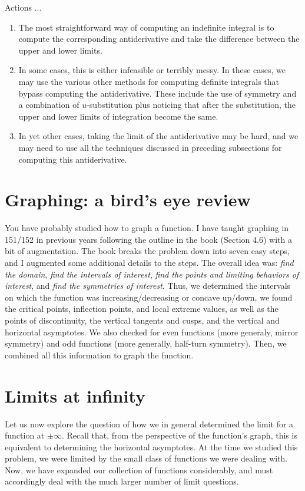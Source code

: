 \documentclass[10pt]{amsart}
\begin{document}
Actions ...

\begin{enumerate}
\item The most straightforward way of computing an indefinite integral
  is to compute the corresponding antiderivative and take the
  difference between the upper and lower limits.
\item In some cases, this is either infeasible or terribly messy. In
  these cases, we may use the various other methods for computing
  definite integrals that bypass computing the antiderivative. These
  include the use of symmetry and a combination of $u$-substitution
  plus noticing that after the substitution, the upper and lower
  limits of integration become the same.
\item In yet other cases, taking the limit of the antiderivative may
  be hard, and we may need to use all the techniques discussed in
  preceding subsections for computing this antiderivative.
\end{enumerate}

\section{Graphing: a bird's eye review}

You have probably studied how to graph a function. I have taught
graphing in 151/152 in previous years following the outline in the
book (Section 4.6) with a bit of augmentation. The book breaks the
problem down into seven easy steps, and I augmented some additional
details to the steps. The overall idea was: {\em find the domain},
{\em find the intervals of interest}, {\em find the points and
  limiting behaviors of interest}, and {\em find the symmetries of
  interest}. Thus, we determined the intervals on which the function
was increasing/decreasing or concave up/down, we found the critical
points, inflection points, and local extreme values, as well as the
points of discontinuity, the vertical tangents and cusps, and the
vertical and horizontal asymptotes. We also checked for even functions
(more generaly, mirror symmetry) and odd functions (more generally,
half-turn symmetry). Then, we combined all this information to graph
the function.

\section{Limits at infinity}

Let us now explore the question of how we in general determined the
limit for a function at $\pm \infty$. Recall that, from the
perspective of the function's graph, this is equivalent to determining
the horizontal asymptotes. At the time we studied this problem, we
were limited by the small class of functions we were dealing
with. Now, we have expanded our collection of functions considerably,
and must accordingly deal with the much larger number of limit
questions.
\end{document}
